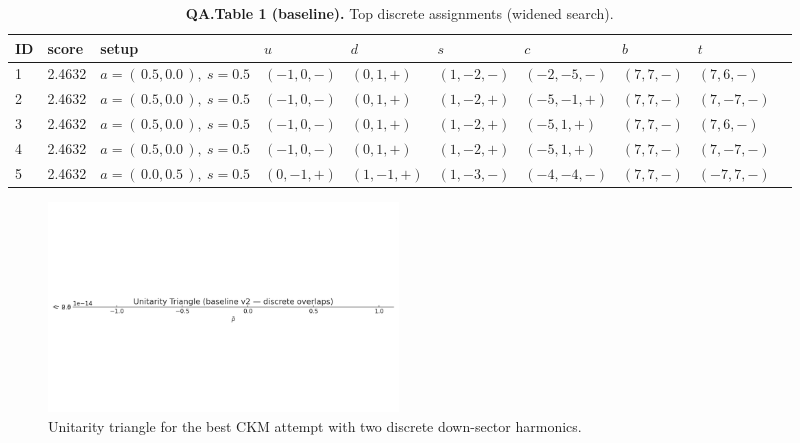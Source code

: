 \begin{table}[h]
\centering
\small
\caption{\textbf{QA.Table 1 (baseline).} Top discrete assignments (widened search).}
\begin{tabular}{llllllllll}
\hline
ID & score & setup & $u$ & $d$ & $s$ & $c$ & $b$ & $t$\\
\hline
1 & 2.4632 & $a=(\,0.5,0.0\,),\ s=0.5$ & $(-1,0,-)$ & $(0,1,+)$ & $(1,-2,-)$ & $(-2,-5,-)$ & $(7,7,-)$ & $(7,6,-)$\\
2 & 2.4632 & $a=(\,0.5,0.0\,),\ s=0.5$ & $(-1,0,-)$ & $(0,1,+)$ & $(1,-2,+)$ & $(-5,-1,+)$ & $(7,7,-)$ & $(7,-7,-)$\\
3 & 2.4632 & $a=(\,0.5,0.0\,),\ s=0.5$ & $(-1,0,-)$ & $(0,1,+)$ & $(1,-2,+)$ & $(-5,1,+)$ & $(7,7,-)$ & $(7,6,-)$\\
4 & 2.4632 & $a=(\,0.5,0.0\,),\ s=0.5$ & $(-1,0,-)$ & $(0,1,+)$ & $(1,-2,+)$ & $(-5,1,+)$ & $(7,7,-)$ & $(7,-7,-)$\\
5 & 2.4632 & $a=(\,0.0,0.5\,),\ s=0.5$ & $(0,-1,+)$ & $(1,-1,+)$ & $(1,-3,-)$ & $(-4,-4,-)$ & $(7,7,-)$ & $(-7,7,-)$\\
\hline
\end{tabular}
\end{table}



\begin{figure}[h]
\centering
\includegraphics[width=0.45\textwidth]{fig_QA_unitarity_triangle_v2.png}
\caption{Unitarity triangle for the best CKM attempt with two discrete down-sector harmonics.}
\end{figure}

